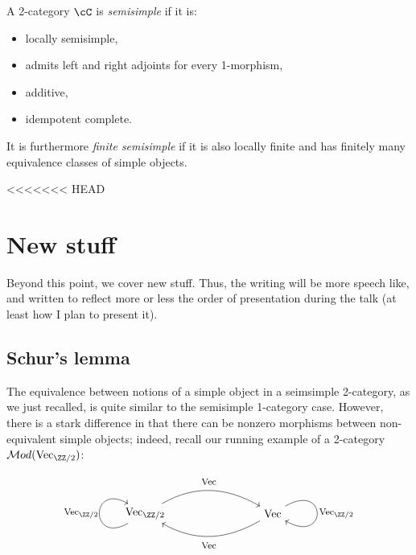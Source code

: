 \documentclass[12pt]{article}
\newcommand{\Mod}{{\mathcal{M}od}}
\newcommand{\Vect}{{\textrm{Vec}}}
\newcommand{\Mod}{{\mathcal{M}od}}
\begin{document}
\begin{definition}
A 2-category $\cC$ is \emph{semisimple}
if it is:
\begin{itemize}
\item locally semisimple,
\item admits left and right adjoints for every 1-morphism,
\item additive,
\item idempotent complete.
\end{itemize}

It is furthermore \emph{finite semisimple}
if it is also locally finite and
has finitely many equivalence classes of simple objects.
\end{definition}

<<<<<<< HEAD


\section{New stuff}

Beyond this point, we cover new stuff.
Thus, the writing will be more speech like,
and written to reflect more or less the order of presentation
during the talk (at least how I plan to present it).


\subsection{Schur's lemma}

The equivalence between notions of a simple object
in a seimsimple 2-category,
as we just recalled,
is quite similar to the semisimple 1-category case.
However, there is a stark difference in that
there can be nonzero morphisms between
non-equivalent simple objects;
indeed, recall our running example of a 2-category
$\Mod(\Vect_{\ZZ/2})$:

\[
\begin{tikzpicture}
\node (a) at (0,0) {$\Vect_{\ZZ/2}$};
\node (b) at (4,0) {$\Vect$};
\draw[->] (a) to[out=30,in=150] (b);
\node at (2,1) {\footnotesize $\Vect$};
\draw[->] (b) to[out=-150,in=-30] (a);
\node at (2,-1) {\footnotesize $\Vect$};
\draw[->] (a) .. controls +(-150:2cm) and +(150:2cm) .. (a);
\node at (-2,0) {\footnotesize $\Vect_{\ZZ/2}$};
\draw[->] (b) .. controls +(30:2cm) and +(-30:2cm) .. (b);
\node at (6,0) {\footnotesize $\Vect_{\ZZ/2}$};
\end{tikzpicture}
\]
\end{document}
